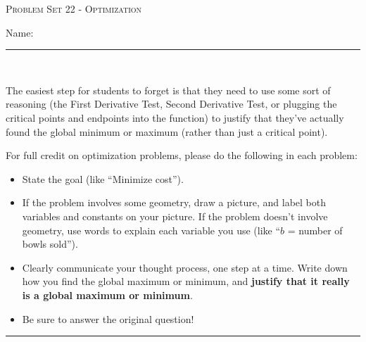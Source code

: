 \documentclass{article}
\begin{document}
\begin{center}
  \large\textsc{Problem Set 22 - Optimization}\vspace{.5in}\\
  \begin{problemonly}
   \large Name: \rule{5cm}{0.15mm}\\
   \end{problemonly}
\end{center}


\begin{workshop}
  The easiest step for students to forget is that they need to use some sort of reasoning (the First Derivative Test, Second Derivative Test, or plugging the critical points and endpoints into the function) to justify that they've actually found the global minimum or maximum (rather than just a critical point).
\end{workshop}

For full credit on optimization problems, please do the following in each problem:
{
  \begin{itemize}[nosep]
  \item State the goal (like ``Minimize cost'').
  \item If the problem involves some geometry, draw a picture, and label both variables and constants on your picture. If the problem doesn't involve geometry, use words to explain each variable you use (like ``$b$ = number of bowls sold'').
  \item Clearly communicate your thought process, one step at a time. Write down how you find the global maximum or minimum, and \textbf{justify that it really is a global maximum or minimum}. 
  \item Be sure to answer the original question!
  \end{itemize}
}

\begin{center}
  \rule{5in}{0.4pt}
\end{center}
\end{document}
